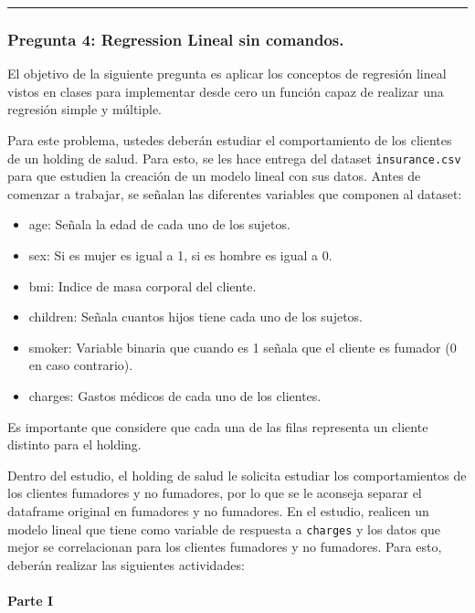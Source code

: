 \documentclass[]{article}
\providecommand{\tightlist}{%
  \setlength{\itemsep}{0pt}\setlength{\parskip}{0pt}}
\let\oldparagraph\paragraph
\renewcommand{\paragraph}[1]{\oldparagraph{#1}\mbox{}}
\begin{document}
\begin{center}\rule{0.5\linewidth}{0.5pt}\end{center}

\hypertarget{pregunta-4-regression-lineal-sin-comandos.}{%
\subsubsection{Pregunta 4: Regression Lineal sin
comandos.}\label{pregunta-4-regression-lineal-sin-comandos.}}

El objetivo de la siguiente pregunta es aplicar los conceptos de
regresión lineal vistos en clases para implementar desde cero un función
capaz de realizar una regresión simple y múltiple.

Para este problema, ustedes deberán estudiar el comportamiento de los
clientes de un holding de salud. Para esto, se les hace entrega del
dataset \texttt{insurance.csv} para que estudien la creación de un
modelo lineal con sus datos. Antes de comenzar a trabajar, se señalan
las diferentes variables que componen al dataset:

\begin{itemize}
\tightlist
\item
  age: Señala la edad de cada uno de los sujetos.
\item
  sex: Si es mujer es igual a 1, si es hombre es igual a 0.
\item
  bmi: Indice de masa corporal del cliente.
\item
  children: Señala cuantos hijos tiene cada uno de los sujetos.
\item
  smoker: Variable binaria que cuando es 1 señala que el cliente es
  fumador (0 en caso contrario).
\item
  charges: Gastos médicos de cada uno de los clientes.
\end{itemize}

Es importante que considere que cada una de las filas representa un
cliente distinto para el holding.

Dentro del estudio, el holding de salud le solicita estudiar los
comportamientos de los clientes fumadores y no fumadores, por lo que se
le aconseja separar el dataframe original en fumadores y no fumadores.
En el estudio, realicen un modelo lineal que tiene como variable de
respuesta a \texttt{charges} y los datos que mejor se correlacionan para
los clientes fumadores y no fumadores. Para esto, deberán realizar las
siguientes actividades:

\hypertarget{parte-i}{%
\paragraph{Parte I}\label{parte-i}}
\end{document}
